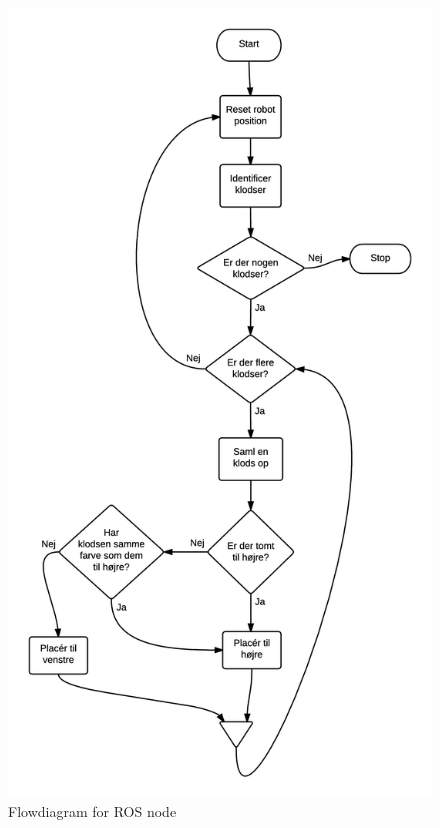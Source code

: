 \begin{figure}[H]
	\centering
	\includegraphics[scale=.7]{images/node-flow}
	\caption{Flowdiagram for ROS node}
	\label{fig:node-flow}
\end{figure}